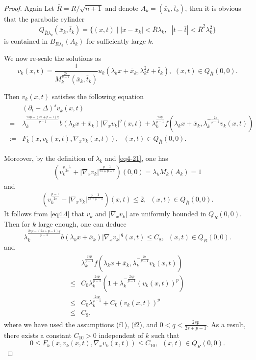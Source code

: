 \documentclass[12pt]{article}
\theoremstyle{remark}
\numberwithin{equation}{section}
\begin{document}
\begin{proof}
Again Let $\bar{R} = R/\sqrt{n+1}$ and denote $A_k = (\bar{x}_k, \bar{t}_k)$,  then it is obvious that the parabolic cylinder
$$ Q_{\bar{R} \lambda_k}(\bar{x}_k, \bar{t}_k)  = \{(x,t) \mid |x-\bar{x}_k| < \bar{R} \lambda_k, \;\; |t-\bar{t}|< \bar{R}^2 \lambda_k^2 \}$$ is contained in
$B_{R\lambda_k}(A_k)$ for sufficiently large $k$.

 We now re-scale the solutions as
 $$
   v_k(x,t)=\frac{1}{M^{\frac{2s}{p-1}}_k(\bar{x}_k, \bar{t}_k)}u_k(\lambda_kx+\bar{x}_k, \lambda_k^2 t + \bar{t}_k), \,\, (x,t) \in Q_{\bar{R}}(0,0).
 $$

Then $v_k(x,t)$ satisfies the following equation
\begin{eqnarray}\label{eq4.2}
\begin{aligned}
&(\partial_t-\Delta)^s v_k(x,t)\\
=&\lambda_k^{\frac{2sp-(2s+p-1)q}{p-1}} b(\lambda_k x+\bar{x}_k)|\nabla_x v_k|^q(x,t)
+\lambda_k^{\frac{2sp}{p-1}} f(\lambda_k x+\bar{x}_k, \lambda_k^{-\frac{2s}{p-1}} v_k(x,t))\\
:=&F_k(x, v_k(x,t), \nabla_x v_k(x,t)),\,\,\,\,  (x,t)\in Q_{\bar{R}}(0,0).
\end{aligned}
\end{eqnarray}


Moreover, by the definition of $\lambda_k$ and \eqref{eq4-21}, one has
\begin{eqnarray}\label{eq4.3}
\left(v_k^{\frac{p-1}{2s}}+|\nabla_x v_k|^{\frac{p-1}{2s+p-1}}\right)(0,0)=\lambda_k M_k(A_k)=1
\end{eqnarray}
and
\begin{eqnarray}\label{eq4.4}
\left(v_k^{\frac{p-1}{2s}}+|\nabla_x v_k|^{\frac{p-1}{2s+p-1}}\right)(x,t)\leq 2,\,\,\,  (x,t)\in Q_{\bar{R}}(0,0).
\end{eqnarray}
It follows from \eqref{eq4.4} that $v_k$ and $|\nabla_x v_k|$ are uniformly bounded in $Q_{\bar{R}}(0,0)$.
Then  for $k$ large enough,  one can deduce
$$
\lambda_k^{\frac{2sp-(2s+p-1)q}{p-1}} b(\lambda_k x+\bar{x}_k)|\nabla_x v_k|^q(x,t)\leq C_8,\,\, \,  (x,t)\in Q_{\bar{R}}(0,0).
$$
and
\begin{eqnarray*}
\begin{aligned}
&\lambda_k^{\frac{2sp}{p-1}} f(\lambda_k x+\bar{x}_k, \lambda_k^{-\frac{2s}{p-1}} v_k(x,t))\\
\leq &C_0 \lambda_k^{\frac{2sp}{p-1}}\left(1+\lambda_k^{-\frac{2sp}{p-1}}(v_k(x,t))^p\right)\\
\leq &C_0 \lambda_k^{\frac{2sp}{p-1}}+C_0(v_k(x,t))^p\\
\leq & C_9,
\end{aligned}
\end{eqnarray*}
where we have used the assumptions (f1), (f2),  and $0<q<\frac{2sp}{2s+p-1}.$
As a result, there exists a constant $C_{10}>0$ independent of $k$ such that
$$
0\leq F_k(x, v_k(x,t), \nabla_x v_k(x,t))\leq C_{10},\,\, \, (x,t)\in Q_{\bar{R}}(0,0).
$$



\end{proof}
\end{document}
